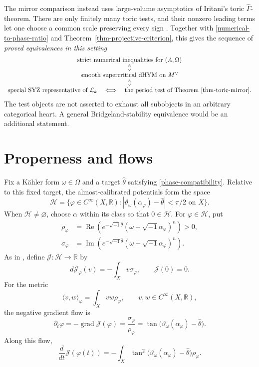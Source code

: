 \documentclass[12pt,reqno]{amsart}
\numberwithin{equation}{section}
\theoremstyle{plain}
\theoremstyle{definition}
\newcommand{\cH}{\mathcal H}
\newcommand{\R}{\mathbb R}
\begin{document}
The mirror comparison instead uses large-volume asymptotics of
Iritani's toric $\widehat\Gamma$-theorem. There are only finitely many
toric tests, and their nonzero leading terms let one choose a common
scale preserving every sign \cite[Theorem 2.5 and Section 5.2]{Sto25}.
Together with \eqref{numerical-to-phase-ratio} and
Theorem~\ref{thm-projective-criterion}, this gives the sequence of
\emph{proved equivalences in this setting}
\[
 \begin{array}{c}
 \text{strict numerical inequalities for }(A,\Omega)\\
 \Updownarrow\\
 \text{smooth supercritical dHYM on }M^\vee\\
 \Updownarrow\\
 \text{special SYZ representative of }\mathcal L_k
 \quad\Longleftrightarrow\quad\text{the period test of Theorem~\ref{thm-toric-mirror}}.
 \end{array}
\]
The test objects are not asserted to exhaust all subobjects in an
arbitrary categorical heart. A general Bridgeland-stability equivalence
would be an additional statement.

\section{Properness and flows}\label{properness-and-evolution}
Fix a K\"ahler form $\omega\in\Omega$ and a target $\widehat\theta$
satisfying \eqref{phase-compatibility}. Relative to this fixed target,
the almost-calibrated potentials form the space
\[
 \cH=\{\varphi\in C^\infty(X,\R):
 |\vartheta_\omega(\alpha_\varphi)-\widehat\theta|<\pi/2
 \text{ on }X\}.
\]
When $\cH\ne\varnothing$, choose $\alpha$ within its class so that
$0\in\cH$. For $\varphi\in\cH$, put
\begin{align}
 \rho_\varphi&=\operatorname{Re}\left(e^{-\sqrt{-1}\widehat\theta}
               (\omega+\sqrt{-1}\alpha_\varphi)^n\right)>0,\nonumber\\
 \sigma_\varphi&=\operatorname{Im}\left(e^{-\sqrt{-1}\widehat\theta}
               (\omega+\sqrt{-1}\alpha_\varphi)^n\right).
 \label{phase-volume-and-error}
\end{align}
As in \cite{CY18}, define $\mathcal J\colon\cH\to\R$ by
\[
 d\mathcal J_\varphi(v)=-\int_Xv\sigma_\varphi,\qquad \mathcal J(0)=0.
\]
For the metric
\[
 \langle v,w\rangle_\varphi=\int_Xvw\rho_\varphi,
 \qquad v,w\in C^\infty(X,\R),
\]
the negative gradient flow is
\[
 \partial_t\varphi=-\operatorname{grad}\mathcal J(\varphi)
 =\frac{\sigma_\varphi}{\rho_\varphi}
 =\tan\bigl(\vartheta_\omega(\alpha_\varphi)-\widehat\theta\bigr).
\]
Along this flow,
\begin{equation}\label{tangent-flow-energy-identity}
 \frac{d}{dt}\mathcal J(\varphi(t))
 =-\int_X\tan^2\bigl(\vartheta_\omega(\alpha_\varphi)-\widehat\theta\bigr)
 \rho_\varphi.
\end{equation}
\end{document}
